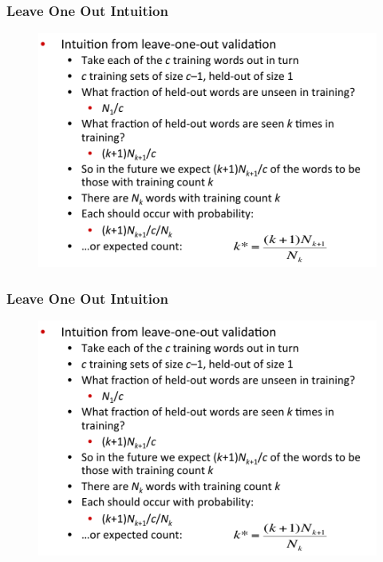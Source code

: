 \documentclass{beamer}
\begin{document}
\begin{frame}\frametitle{Leave One Out Intuition}
\begin{figure}
\includegraphics[width=0.9\linewidth]{figure/good_turing_loo_intuition.pdf}
\label{fig:good_turing_loo_intuition}
\end{figure}
\end{frame}


\begin{frame}\frametitle{Leave One Out Intuition}
\begin{figure}
\includegraphics[width=0.9\linewidth]{figure/good_turing_loo_intuition.pdf}
\label{fig:good_turing_loo_intuition}
\end{figure}
\end{frame}


\end{document}
